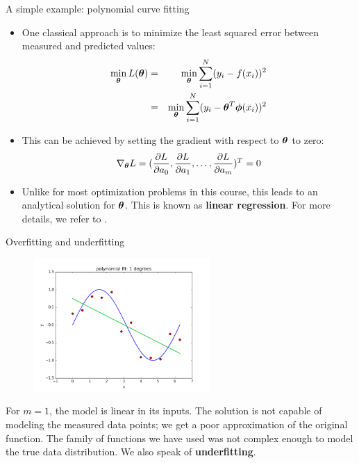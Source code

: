 \documentclass[xcolor=pdftex,dvipsnames,table]{beamer}
\begin{document}
\begin{frame}{A simple example: polynomial curve fitting}
\begin{itemize}
	\item One classical approach is to minimize the least squared error between measured and predicted values:
	\begin{eqnarray}
		\min_{\boldsymbol{\theta}} L(\boldsymbol{\theta}) &=& \min_{\boldsymbol{\theta}} \sum_{i=1}^N (y_i - f(x_i))^2 \nonumber \\
		&=& \min_{\boldsymbol{\theta}} \sum_{i=1}^N (y_i - \boldsymbol{\theta}^T \boldsymbol{\phi} (x_i))^2 
	\end{eqnarray}
	\item This can be achieved by setting the gradient with respect to $\boldsymbol{\theta}$ to zero:
	\begin{equation}
		\nabla_{\boldsymbol{\theta}} L = (\frac{\partial L}{\partial a_0}, \frac{\partial L}{\partial a_1}, \ldots, \frac{\partial L}{\partial a_m} )^T = 0
	\end{equation}
	\item Unlike for most optimization problems in this course, this leads to an analytical solution for $\boldsymbol{\theta}$. This is known as \textbf{linear regression}. For more details, we refer to \cite{Hastie2009}.
\end{itemize}
\end{frame}

\begin{frame}{Overfitting and underfitting}
\begin{figure}[htb]
\includegraphics[width=0.6\textwidth]{../graphics/polyfit_degree_1.png}
\end{figure}
For $m=1$, the model is linear in its inputs. The solution is not capable of modeling the measured data points; we get a poor approximation of the original function. The family of functions we have used was not complex enough to model the true data distribution. We also speak of \textbf{underfitting}.
\end{frame}
\end{document}
